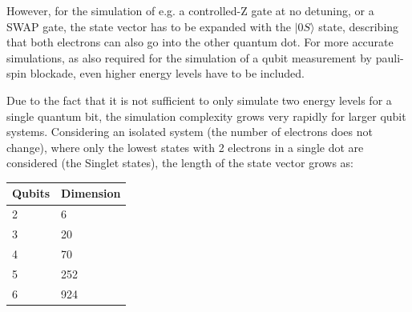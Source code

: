 \documentclass[10pt,a4paper,onecolumn,notitlepage]{article}
\begin{document}
However, for the simulation of e.g. a controlled-Z gate at no detuning, or a SWAP gate, the state vector has to be expanded with the $|\mathord{0S}\rangle$ state, describing that both electrons can also go into the other quantum dot. For more accurate simulations, as also required for the simulation of a qubit measurement by pauli-spin blockade, even higher energy levels have to be included.

Due to the fact that it is not sufficient to only simulate two energy levels for a single quantum bit, the simulation complexity grows very rapidly for larger qubit
systems. Considering an isolated system (the number of electrons does not change), where only the lowest states with 2 electrons in a single dot are considered (the Singlet states), the length of the state vector grows as:

\begin{tabular}{ll}
	Qubits & Dimension \\
	\hline
	2 & 6 \\
	3 & 20 \\
	4 & 70 \\
	5 & 252 \\
	6 & 924
\end{tabular}
\end{document}
